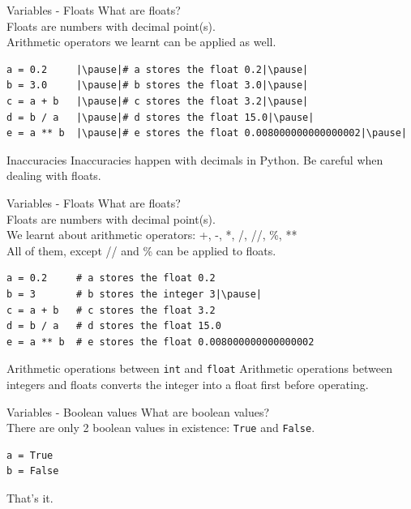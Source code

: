 \documentclass[dvipsnames, svgnames, x11names, handout]{beamer}
\begin{document}
\begin{frame}[fragile]{Variables - Floats}
What are floats?\pause\\
Floats are numbers with decimal point(s).\pause\\
Arithmetic operators we learnt can be applied as well.
\begin{verbatim}
a = 0.2     |\pause|# a stores the float 0.2|\pause|
b = 3.0     |\pause|# b stores the float 3.0|\pause|
c = a + b   |\pause|# c stores the float 3.2|\pause|
d = b / a   |\pause|# d stores the float 15.0|\pause|
e = a ** b  |\pause|# e stores the float 0.008000000000000002|\pause|
\end{verbatim}
\begin{alertblock}{Inaccuracies}
Inaccuracies happen with decimals in Python. Be careful when dealing with floats.
\end{alertblock}
\end{frame}

\begin{frame}[fragile]{Variables - Floats}
What are floats?\\
Floats are numbers with decimal point(s).\\
We learnt about arithmetic operators: +, -, *, /, //, \%, **\\
All of them, except // and \% can be applied to floats.
\begin{verbatim}
a = 0.2     # a stores the float 0.2
b = 3       # b stores the integer 3|\pause|
c = a + b   # c stores the float 3.2
d = b / a   # d stores the float 15.0
e = a ** b  # e stores the float 0.008000000000000002
\end{verbatim}
\pause
\begin{block}{Arithmetic operations between \texttt{int} and \texttt{float}}
Arithmetic operations between integers and floats converts the integer into a float first before operating.
\end{block}
\end{frame}



\begin{frame}[fragile]{Variables - Boolean values}
What are boolean values?\pause\\
There are only 2 boolean values in existence: \texttt{True} and \texttt{False}.\pause
\begin{verbatim}
a = True
b = False
\end{verbatim}
\vspace{2cm}
\pause That's it.
\end{frame}
\end{document}
